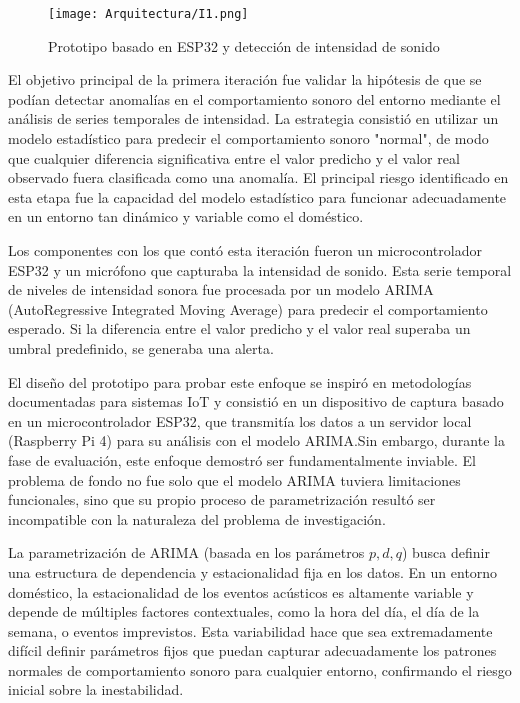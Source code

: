 
      \begin{figure}[ht!]
            \centering
            \texttt{[image: Arquitectura/I1.png]}
            \caption{Prototipo basado en ESP32 y detección de intensidad de sonido}
            \label{fig:prototipo1}
      \end{figure}

El objetivo principal de la primera iteración fue validar la hipótesis de que se podían detectar anomalías en el comportamiento sonoro del entorno mediante el análisis de series temporales de intensidad. La estrategia consistió en utilizar un modelo estadístico para predecir el comportamiento sonoro "normal", de modo que cualquier diferencia significativa entre el valor predicho y el valor real observado fuera clasificada como una anomalía. El principal riesgo identificado en esta etapa fue la capacidad del modelo estadístico para funcionar adecuadamente en un entorno tan dinámico y variable como el doméstico.

Los componentes con los que contó esta iteración fueron un microcontrolador ESP32 y un micrófono que capturaba la intensidad de sonido. Esta serie temporal de niveles de intensidad sonora fue procesada por un modelo ARIMA (AutoRegressive Integrated Moving Average) para predecir el comportamiento esperado. Si la diferencia entre el valor predicho y el valor real superaba un umbral predefinido, se generaba una alerta.

El diseño del prototipo para probar este enfoque se inspiró en metodologías documentadas para sistemas IoT \cite{luis2024desarrollo} y consistió en un dispositivo de captura basado en un microcontrolador ESP32, que transmitía los datos a un servidor local (Raspberry Pi 4) para su análisis con el modelo ARIMA.Sin embargo, durante la fase de evaluación, este enfoque demostró ser fundamentalmente inviable. El problema de fondo no fue solo que el modelo ARIMA tuviera limitaciones funcionales, sino que su propio proceso de parametrización resultó ser incompatible con la naturaleza del problema de investigación.

La parametrización de ARIMA (basada en los parámetros $p, d, q$) busca definir una estructura de dependencia y estacionalidad fija en los datos. En un entorno doméstico, la estacionalidad de los eventos acústicos es altamente variable y depende de múltiples factores contextuales, como la hora del día, el día de la semana, o eventos imprevistos. Esta variabilidad hace que sea extremadamente difícil definir parámetros fijos que puedan capturar adecuadamente los patrones normales de comportamiento sonoro para cualquier entorno, confirmando el riesgo inicial sobre la inestabilidad.

